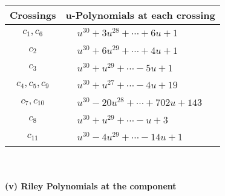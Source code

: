 \documentclass[1p]{elsarticle_modified}
\theoremstyle{definition}
\begin{document}
\begin{tabular}{m{50pt}|m{274pt}}
Crossings & \hspace{64pt}u-Polynomials at each crossing \\
\hline $$\begin{aligned}c_{1},c_{6}\end{aligned}$$&$\begin{aligned}
&u^{30}+3 u^{28}+\cdots+6 u+1
\end{aligned}$\\
\hline $$\begin{aligned}c_{2}\end{aligned}$$&$\begin{aligned}
&u^{30}+6 u^{29}+\cdots+4 u+1
\end{aligned}$\\
\hline $$\begin{aligned}c_{3}\end{aligned}$$&$\begin{aligned}
&u^{30}+u^{29}+\cdots-5 u+1
\end{aligned}$\\
\hline $$\begin{aligned}c_{4},c_{5},c_{9}\end{aligned}$$&$\begin{aligned}
&u^{30}+u^{27}+\cdots-4 u+19
\end{aligned}$\\
\hline $$\begin{aligned}c_{7},c_{10}\end{aligned}$$&$\begin{aligned}
&u^{30}-20 u^{28}+\cdots+702 u+143
\end{aligned}$\\
\hline $$\begin{aligned}c_{8}\end{aligned}$$&$\begin{aligned}
&u^{30}+u^{29}+\cdots- u+3
\end{aligned}$\\
\hline $$\begin{aligned}c_{11}\end{aligned}$$&$\begin{aligned}
&u^{30}-4 u^{29}+\cdots-14 u+1
\end{aligned}$\\
\hline
\end{tabular}\\~\\
\newpage\renewcommand{\arraystretch}{1}
\flushleft \textbf{(v) Riley Polynomials at the component}\newline \\
\end{document}
